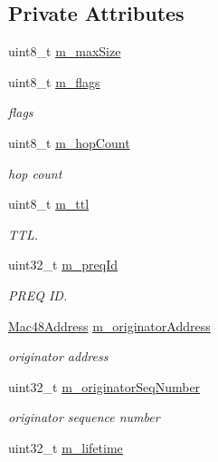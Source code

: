 \subsection*{Private Attributes}
\begin{DoxyCompactItemize}
\item 
uint8\+\_\+t \hyperlink{classns3_1_1dot11s_1_1IePreq_ad3d4a5ee9888f618175e35552b1a84f8}{m\+\_\+max\+Size}
\item 
uint8\+\_\+t \hyperlink{classns3_1_1dot11s_1_1IePreq_aa481740d69cb64893525bc6f0e46f222}{m\+\_\+flags}
\begin{DoxyCompactList}\small\item\em flags \end{DoxyCompactList}\item 
uint8\+\_\+t \hyperlink{classns3_1_1dot11s_1_1IePreq_a90d9d255882c0fb97aacc3e00975dea0}{m\+\_\+hop\+Count}
\begin{DoxyCompactList}\small\item\em hop count \end{DoxyCompactList}\item 
uint8\+\_\+t \hyperlink{classns3_1_1dot11s_1_1IePreq_abb359cf45de091550c6b641ed0e44bd5}{m\+\_\+ttl}
\begin{DoxyCompactList}\small\item\em T\+TL. \end{DoxyCompactList}\item 
uint32\+\_\+t \hyperlink{classns3_1_1dot11s_1_1IePreq_a6c44925a70c9b23648530ad92919b976}{m\+\_\+preq\+Id}
\begin{DoxyCompactList}\small\item\em P\+R\+EQ ID. \end{DoxyCompactList}\item 
\hyperlink{classns3_1_1Mac48Address}{Mac48\+Address} \hyperlink{classns3_1_1dot11s_1_1IePreq_ad28b90801092d3c2accf79c2e6185624}{m\+\_\+originator\+Address}
\begin{DoxyCompactList}\small\item\em originator address \end{DoxyCompactList}\item 
uint32\+\_\+t \hyperlink{classns3_1_1dot11s_1_1IePreq_a06180eb291acfe73e88640ab62120fc1}{m\+\_\+originator\+Seq\+Number}
\begin{DoxyCompactList}\small\item\em originator sequence number \end{DoxyCompactList}\item 
uint32\+\_\+t \hyperlink{classns3_1_1dot11s_1_1IePreq_afada94989172c28d2c6e2154833685b8}{m\+\_\+lifetime}

\end{DoxyCompactItemize}
